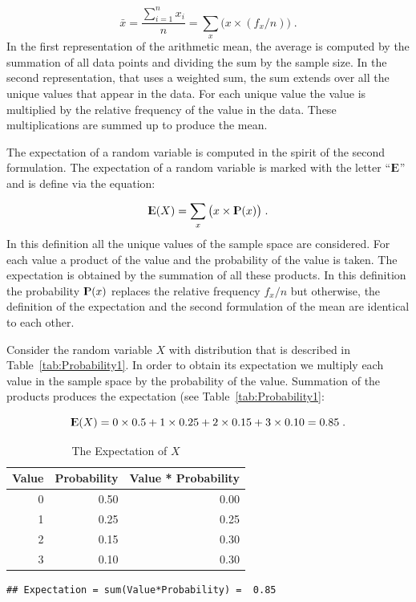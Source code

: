 \documentclass[]{krantz}
\newcommand{\Expec}{{\rm I\kern-.3em E}}
\newcommand{\Prob}{{\rm I\kern-.3em P}}
\theoremstyle{definition}
\theoremstyle{definition}
\theoremstyle{definition}
\theoremstyle{remark}
\begin{document}
\[\bar x = \frac{\sum_{i=1}^n x_i}{n} = \sum_x \big(x \times (f_x/n)\big)\;.\]
In the first representation of the arithmetic mean, the average is
computed by the summation of all data points and dividing the sum by the
sample size. In the second representation, that uses a weighted sum, the
sum extends over all the unique values that appear in the data. For each
unique value the value is multiplied by the relative frequency of the
value in the data. These multiplications are summed up to produce the
mean.

The expectation of a random variable is computed in the spirit of the
second formulation. The expectation of a random variable is marked with
the letter ``\(\Expec\)'' and is define via the equation:

\[\Expec(X) = \sum_x \big(x \times \Prob(x)\big)\;.\] In this definition
all the unique values of the sample space are considered. For each value
a product of the value and the probability of the value is taken. The
expectation is obtained by the summation of all these products. In this
definition the probability \(\Prob(x)\) replaces the relative frequency
\(f_x/n\) but otherwise, the definition of the expectation and the second
formulation of the mean are identical to each other.

Consider the random variable \(X\) with distribution that is described in
Table~\ref{tab:Probability1}. In order to obtain its expectation we
multiply each value in the sample space by the probability of the value.
Summation of the products produces the expectation (see
Table~\ref{tab:Probability1}:

\[\Expec(X) = 0 \times 0.5 + 1 \times 0.25 + 2 \times 0.15 + 3\times 0.10 = 0.85\;.\]

\begin{table}[t]

\caption{\label{tab:Probability2}The Expectation of $X$}
\centering
\begin{tabular}{rrr}
\toprule
Value & Probability & Value * Probability\\
\midrule
0 & 0.50 & 0.00\\
1 & 0.25 & 0.25\\
2 & 0.15 & 0.30\\
3 & 0.10 & 0.30\\
\bottomrule
\end{tabular}
\end{table}

\begin{verbatim}
## Expectation = sum(Value*Probability) =  0.85
\end{verbatim}
\end{document}
